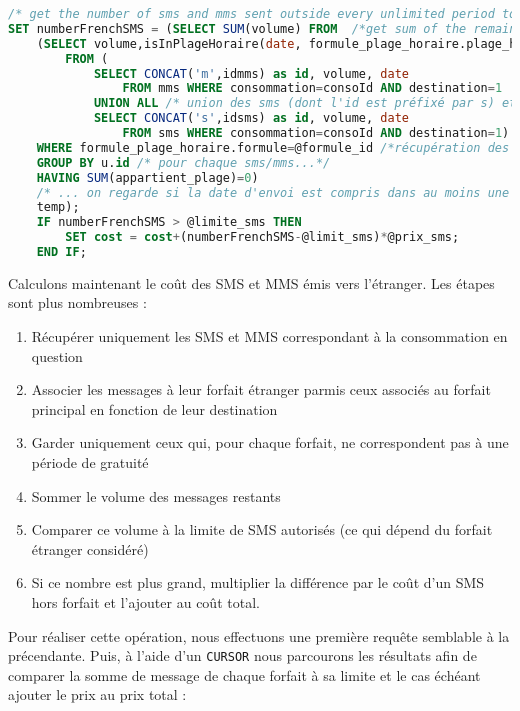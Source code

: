 \begin{lstlisting}[language=sql]
/* get the number of sms and mms sent outside every unlimited period to a french phone for the right month*/
SET numberFrenchSMS = (SELECT SUM(volume) FROM  /*get sum of the remaining volume of sms and mms */
    (SELECT volume,isInPlageHoraire(date, formule_plage_horaire.plage_horaire) as appartient_plage
        FROM (
            SELECT CONCAT('m',idmms) as id, volume, date
                FROM mms WHERE consommation=consoId AND destination=1
            UNION ALL /* union des sms (dont l'id est préfixé par s) et des mms (dont l'id est préfixé par m) */
            SELECT CONCAT('s',idsms) as id, volume, date
                FROM sms WHERE consommation=consoId AND destination=1) u, formule_plage_horaire
    WHERE formule_plage_horaire.formule=@formule_id /*récupération des plages horaires correspondant à la formule */
    GROUP BY u.id /* pour chaque sms/mms...*/
    HAVING SUM(appartient_plage)=0)
    /* ... on regarde si la date d'envoi est compris dans au moins une plage */
    temp);
    IF numberFrenchSMS > @limite_sms THEN
        SET cost = cost+(numberFrenchSMS-@limit_sms)*@prix_sms;
    END IF;
\end{lstlisting}


Calculons maintenant le coût des SMS et MMS émis vers l'étranger. Les étapes sont plus nombreuses :
\begin{enumerate}[label=\textbf{\thColor{\arabic*}}]
	\item Récupérer uniquement les SMS et MMS correspondant à la consommation en question
	\item Associer les messages à leur forfait étranger parmis ceux associés au forfait principal en fonction de leur destination
	\item Garder uniquement ceux qui, pour chaque forfait, ne correspondent pas à une période de gratuité
	\item Sommer le volume des messages restants
	\item Comparer ce volume à la limite de SMS autorisés (ce qui dépend du forfait étranger considéré)
	\item Si ce nombre est plus grand, multiplier la différence par le coût d'un SMS hors forfait et l'ajouter au coût total.
\end{enumerate}

Pour réaliser cette opération, nous effectuons une première requête semblable à la précendante. Puis, à l'aide d'un \texttt{CURSOR} nous parcourons les résultats afin de comparer la somme de message de chaque forfait à sa limite et le cas échéant ajouter le prix au prix total :


